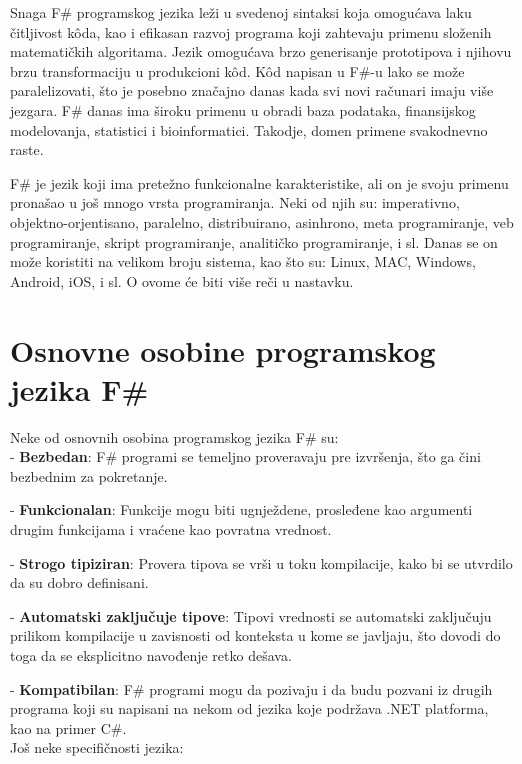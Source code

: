 \documentclass[a4paper]{article}
\begin{document}
Snaga F\# programskog jezika leži u svedenoj sintaksi koja omogućava laku čitljivost kôda, kao i efikasan razvoj programa koji zahtevaju primenu složenih matematičkih algoritama. Jezik omogućava brzo generisanje prototipova i njihovu brzu transformaciju u produkcioni kôd. Kôd napisan u F\#-u lako se može paralelizovati, što je posebno značajno danas kada svi novi računari imaju više jezgara. F\# danas ima široku primenu u obradi baza podataka, finansijskog modelovanja, statistici i bioinformatici. Takodje, domen primene svakodnevno raste.

F\# je jezik koji ima pretežno funkcionalne karakteristike, ali on je svoju primenu pronašao u još mnogo vrsta programiranja. Neki od njih su: imperativno, objektno-orjentisano, paralelno, distribuirano, asinhrono, meta programiranje, veb programiranje, skript programiranje, analitičko programiranje, i sl. Danas se on može koristiti na velikom broju sistema, kao što su: Linux, MAC, Windows, Android, iOS, i sl. O ovome će biti više reči u nastavku. 


\section{Osnovne osobine programskog jezika F\#}

Neke od osnovnih osobina programskog jezika F\# su:\\

	- \textbf{Bezbedan}: F\# programi se temeljno proveravaju pre izvršenja, što ga čini bezbednim za pokretanje.

	- \textbf{Funkcionalan}: Funkcije mogu biti ugnježdene, prosleđene kao argumenti drugim funkcijama i vraćene kao povratna vrednost.

	- \textbf{Strogo tipiziran}: Provera tipova se vrši u toku kompilacije, kako bi se utvrdilo da su dobro definisani. 

	- \textbf{Automatski zaključuje tipove}: Tipovi vrednosti se automatski zaključuju prilikom kompilacije u zavisnosti od konteksta u kome se javljaju, što dovodi do toga da se eksplicitno navođenje retko dešava.

	- \textbf{Kompatibilan}: F\# programi mogu da pozivaju i da budu pozvani iz drugih programa koji su napisani na nekom od jezika koje podržava .NET platforma, kao na primer C\#\cite{microsoft_c}. 
\\
 
	Još neke specifičnosti jezika: \\
	
\end{document}
